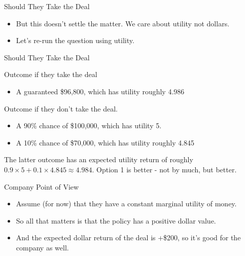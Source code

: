 \documentclass[
  ignorenonframetext,
]{beamer}
\providecommand{\tightlist}{%
  \setlength{\itemsep}{0pt}\setlength{\parskip}{0pt}}
\renewcommand{\,}{\text{, }}
\begin{document}
\begin{frame}{Should They Take the Deal}
\protect\hypertarget{should-they-take-the-deal-1}{}

\begin{itemize}
\tightlist
\item
  But this doesn't settle the matter. We care about utility not dollars.
\item
  Let's re-run the question using utility.
\end{itemize}

\end{frame}

\begin{frame}{Should They Take the Deal}
\protect\hypertarget{should-they-take-the-deal-2}{}

Outcome if they take the deal

\begin{itemize}
\tightlist
\item
  A guaranteed \$96,800, which has utility roughly 4.986 \pause
\end{itemize}

Outcome if they don't take the deal.

\begin{itemize}
\tightlist
\item
  A 90\% chance of \$100,000, which has utility 5.
\item
  A 10\% chance of \$70,000, which has utility roughly 4.845 \pause
\end{itemize}

The latter outcome has an expected utility return of roughly
\(0.9 \times 5 + 0.1 \times 4.845 \approx 4.984\). Option 1 is better -
not by much, but better.

\end{frame}

\begin{frame}{Company Point of View}
\protect\hypertarget{company-point-of-view-1}{}

\begin{itemize}
\tightlist
\item
  Assume (for now) that they have a constant marginal utility of money.
\item
  So all that matters is that the policy has a positive dollar value.
\item
  And the expected dollar return of the deal is +\$200, so it's good for
  the company as well.
\end{itemize}

\end{frame}
\end{document}
